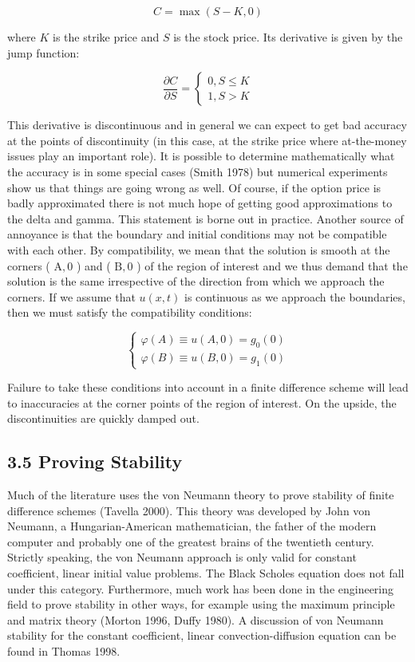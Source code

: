 \documentclass[10pt]{article}
\begin{document}
$$
C=\max (S-K, 0)
$$

where $K$ is the strike price and $S$ is the stock price. Its derivative is given by the jump function:

$$
\frac{\partial C}{\partial S}=\left\{\begin{array}{l}
0, S \leq K \\
1, S>K
\end{array}\right.
$$

This derivative is discontinuous and in general we can expect to get bad accuracy at the points of discontinuity (in this case, at the strike price where at-the-money issues play an important role). It is possible to determine mathematically what the accuracy is in some special cases (Smith 1978) but numerical experiments show us that things are going wrong as well. Of course, if the option price is badly approximated there is not much hope of getting good approximations to the delta and gamma. This statement is borne out in practice. Another source of annoyance is that the boundary and initial conditions may not be compatible with each other. By compatibility, we mean that the solution is smooth at the corners ( $\mathrm{A}, 0$ ) and ( $\mathrm{B}, 0$ ) of the region of interest and we thus demand that the solution is the same irrespective of the direction from which we approach the corners. If we assume that $u(x, t)$ is continuous as we approach the boundaries, then we must satisfy the compatibility conditions:

$$
\left\{\begin{array}{l}
\varphi(A) \equiv u(A, 0)=g_{0}(0) \\
\varphi(B) \equiv u(B, 0)=g_{1}(0)
\end{array}\right.
$$

Failure to take these conditions into account in a finite difference scheme will lead to inaccuracies at the corner points of the region of interest. On the upside, the discontinuities are quickly damped out.

\subsection*{3.5 Proving Stability}
Much of the literature uses the von Neumann theory to prove stability of finite difference schemes (Tavella 2000). This theory was developed by John von Neumann, a Hungarian-American mathematician, the father of the modern computer and probably one of the greatest brains of the twentieth century. Strictly speaking, the von Neumann approach is only valid for constant coefficient, linear initial value problems. The Black Scholes equation does not fall under this category. Furthermore, much work has been done in the engineering field to prove stability in other ways, for example using the maximum principle and matrix theory (Morton 1996, Duffy 1980). A discussion of von Neumann stability for the constant coefficient, linear convection-diffusion equation can be found in Thomas 1998.
\end{document}
